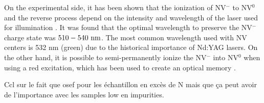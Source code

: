 \documentclass[a4paper,11pt]{report}
\begin{document}
On the experimental side, it has been shown that the ionization of NV$^-$ to NV$^0$ and the reverse process depend on the intensity and wavelength of the laser used for illumination \citep{aslam2013photo}. It was found that the optimal wavelength to preserve the NV$^-$ charge state was  $510-540\ \rm nm$. The most common wavelength used with NV centers is 532 nm (green) due to the historical importance of Nd:YAG lasers. On the other hand, it is possible to semi-permanently ionize the NV$^-$ into NV$^0$ when using a red excitation, which has been used to create an optical memory \citep{dhomkar2016long}.

Ccl sur le fait que osef pour les échantillon en excès de N mais que ça peut avoir de l'importance avec les samples low en impurities.



\printbibliography
\end{document}
